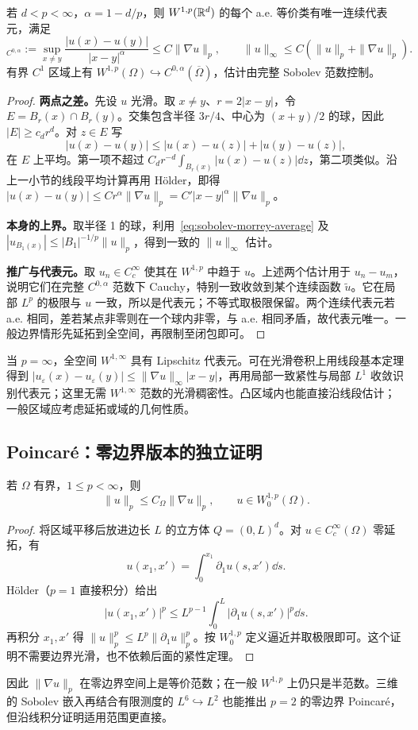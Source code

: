 \begin{theorem}\label{thm:sobolev-morrey}
若 $d<p<\infty$，$\alpha=1-d/p$，则 $W^{1,p}(\mathbb R^d)$ 的每个 a.e. 等价类有唯一连续代表元，满足
\begin{equation}
 [u]_{C^{0,\alpha}}:=\sup_{x\ne y}\frac{|u(x)-u(y)|}{|x-y|^\alpha}
 \le C\|\nabla u\|_p,\qquad
 \|u\|_\infty\le C(\|u\|_p+\|\nabla u\|_p).
 \label{eq:sobolev-morrey}
\end{equation}
有界 $C^1$ 区域上有 $W^{1,p}(\Omega)\hookrightarrow C^{0,\alpha}(\overline\Omega)$，估计由完整 Sobolev 范数控制。
\end{theorem}
\begin{proof}
\textbf{两点之差。}先设 $u$ 光滑。取 $x\ne y$、$r=2|x-y|$，令 $E=B_r(x)\cap B_r(y)$。交集包含半径 $3r/4$、中心为 $(x+y)/2$ 的球，因此 $|E|\ge c_dr^d$。对 $z\in E$ 写
\[
 |u(x)-u(y)|\le |u(x)-u(z)|+|u(y)-u(z)|,
\]
在 $E$ 上平均。第一项不超过 $C_dr^{-d}\int_{B_r(x)}|u(x)-u(z)|\dd z$，第二项类似。沿上一小节的线段平均计算再用 H\"older，即得
$|u(x)-u(y)|\le C r^\alpha\|\nabla u\|_p=C'|x-y|^\alpha\|\nabla u\|_p$。

\textbf{本身的上界。}取半径 1 的球，利用~\eqref{eq:sobolev-morrey-average} 及 $|u_{B_1(x)}|\le |B_1|^{-1/p}\|u\|_p$，得到一致的 $\|u\|_\infty$ 估计。

\textbf{推广与代表元。}取 $u_n\in C_c^\infty$ 使其在 $W^{1,p}$ 中趋于 $u$。上述两个估计用于 $u_n-u_m$，说明它们在完整 $C^{0,\alpha}$ 范数下 Cauchy，特别一致收敛到某个连续函数 $\widetilde u$。它在局部 $L^p$ 的极限与 $u$ 一致，所以是代表元；不等式取极限保留。两个连续代表元若 a.e. 相同，差若某点非零则在一个球内非零，与 a.e. 相同矛盾，故代表元唯一。一般边界情形先延拓到全空间，再限制至闭包即可。
\end{proof}

当 $p=\infty$，全空间 $W^{1,\infty}$ 具有 Lipschitz 代表元。可在光滑卷积上用线段基本定理得到 $|u_\varepsilon(x)-u_\varepsilon(y)|\le\|\nabla u\|_\infty|x-y|$，再用局部一致紧性与局部 $L^1$ 收敛识别代表元；这里无需 $W^{1,\infty}$ 范数的光滑稠密性。凸区域内也能直接沿线段估计；一般区域应考虑延拓或域的几何性质。

\subsection{Poincar\'e：零边界版本的独立证明}

\begin{theorem}\label{thm:sobolev-poincare}
若 $\Omega$ 有界，$1\le p<\infty$，则
\begin{equation}
 \|u\|_p\le C_\Omega\|\nabla u\|_p,
 \qquad u\in W^{1,p}_0(\Omega).
 \label{eq:sobolev-poincare}
\end{equation}
\end{theorem}
\begin{proof}
将区域平移后放进边长 $L$ 的立方体 $Q=(0,L)^d$。对 $u\in C_c^\infty(\Omega)$ 零延拓，有
\[
 u(x_1,x')=\int_0^{x_1}\partial_1u(s,x')\dd s.
\]
H\"older（$p=1$ 直接积分）给出
\[
 |u(x_1,x')|^p\le L^{p-1}\int_0^L|\partial_1u(s,x')|^p\dd s.
\]
再积分 $x_1,x'$ 得 $\|u\|_p^p\le L^p\|\partial_1u\|_p^p$。按 $W^{1,p}_0$ 定义逼近并取极限即可。这个证明不需要边界光滑，也不依赖后面的紧性定理。
\end{proof}

因此 $\|\nabla u\|_p$ 在零边界空间上是等价范数；在一般 $W^{1,p}$ 上仍只是半范数。三维的 Sobolev 嵌入再结合有限测度的 $L^6\hookrightarrow L^2$ 也能推出 $p=2$ 的零边界 Poincar\'e，但沿线积分证明适用范围更直接。


